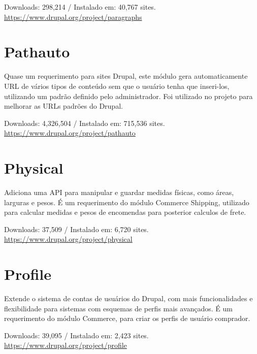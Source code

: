 \begin{center}
  Downloads: 298,214 / Instalado em: 40,767 sites. \\
  \url{https://www.drupal.org/project/paragraphs}
\end{center}

\section{Pathauto}
Quase um requerimento para sites Drupal, este módulo gera automaticamente URL de vários tipos de conteúdo sem que o usuário tenha que inseri-los, utilizando um padrão definido pelo administrador. Foi utilizado no projeto para melhorar as URLs padrões do Drupal.

\begin{center}
  Downloads: 4,326,504 / Instalado em: 715,536 sites. \\
  \url{https://www.drupal.org/project/pathauto}
\end{center}

\section{Physical}
Adiciona uma API para manipular e guardar medidas físicas, como áreas, larguras e pesos. É um requerimento do módulo Commerce Shipping, utilizado para calcular medidas e pesos de encomendas para posterior calculos de frete.

\begin{center}
  Downloads: 37,509 / Instalado em: 6,720 sites. \\
  \url{https://www.drupal.org/project/physical}
\end{center}

\section{Profile}
Extende o sistema de contas de usuários do Drupal, com mais funcionalidades e flexibilidade para sistemas com esquemas de perfis mais avançados. É um requerimento do módulo Commerce, para criar os perfis de usuário comprador.

\begin{center}
  Downloads: 39,095 / Instalado em: 2,423 sites. \\
  \url{https://www.drupal.org/project/profile}
\end{center}

